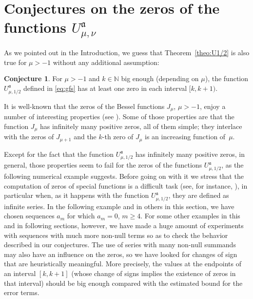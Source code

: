 \documentclass[10pt,a4paper]{article}
\numberwithin{equation}{section}
\theoremstyle{plain}
\theoremstyle{definition}
\newtheorem{Conjecture}{Conjecture}[section]
\newcommand{\aA}{\mathfrak{a}}
\newcommand{\NN}{\mathbb{N}}
\begin{document}
\section{Conjectures on the zeros of the functions $U_{\mu,\nu}^\aA$}
\label{sec:zerosU}

As we pointed out in the Introduction, we guess that Theorem~\ref{theo:U1/2} is also true for $\mu>-1$ without any additional assumption:

\begin{Conjecture}
\label{conj:zeros}
For $\mu>-1$ and $k\in \NN$ big enough (depending on $\mu$), the function $U_{\mu,1/2}^{\aA}$ defined in \eqref{eq:gfs} has at least one zero in each interval $[k,k+1)$.
\end{Conjecture}

It is well-known that the zeros of the Bessel functions $J_\mu$, $\mu>-1$, enjoy a number of interesting properties (see \cite[Ch.~XV]{Wat}). Some of those properties are that the function $J_\mu$ has infinitely many positive zeros, all of them simple; they interlace with the zeros of $J_{\mu +1}$ and the $k$-th zero of $J_\mu$ is an increasing function of~$\mu$.

Except for the fact that the function $U_{\mu,1/2}^\aA$ has infinitely many positive zeros, in general, those properties seem to fail for the zeros of the functions $U_{\mu,1/2}^\aA$, as the following numerical example suggests.
Before going on with it we stress that the computation of zeros of special functions is a difficult task (see, for instance, \cite{GS}), in particular when, as it happens with the function $U_{\mu,1/2}^\aA$, they are defined as infinite series. In the following example and in others in this section, we have chosen sequences $a_m$ for which $a_m=0$, $m\ge 4$. For some other examples in this and in following sections, however, we have made a huge amount of experiments with sequences with much more non-null terms so as to check the behavior described in our conjectures. The use of series with many non-null summands
may also have an influence on the zeros, so we have looked for changes of sign that are heuristically meaningful. More precisely, the values at the endpoints of an interval $[k,k+1]$ (whose change of signs implies the existence of zeros in that interval) should be big enough compared with the estimated bound for the error terms.
\end{document}

